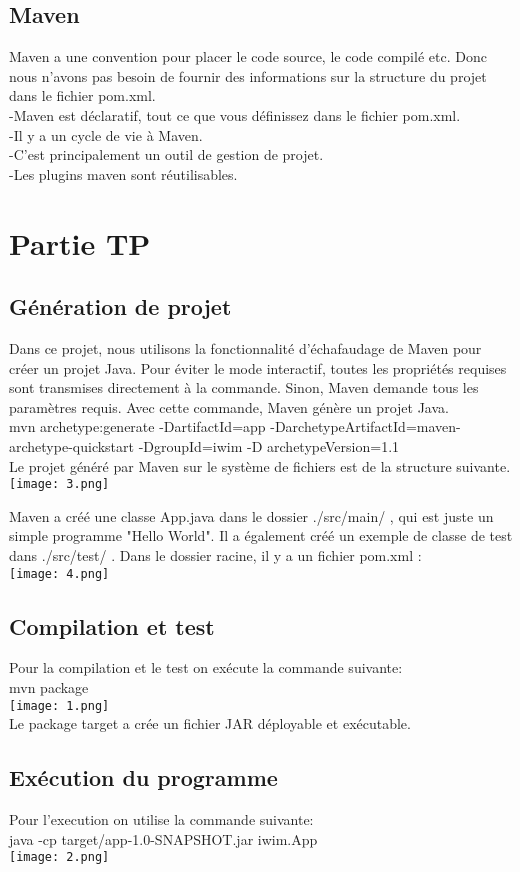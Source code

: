 \documentclass{report}
\begin{document}
\subsection{Maven}
Maven a une convention pour placer le code source, le code compilé etc. Donc nous n'avons pas besoin de fournir des informations sur la structure du projet dans le fichier pom.xml.\\
-Maven est déclaratif, tout ce que vous définissez dans le fichier pom.xml.\\
-Il y a un cycle de vie à Maven.\\
-C'est principalement un outil de gestion de projet.\\ 
-Les plugins maven sont réutilisables.\\
\section{Partie TP }
\subsection{Génération de projet}
Dans ce projet, nous utilisons la fonctionnalité d'échafaudage de Maven pour créer un projet Java. Pour éviter le mode interactif, toutes les propriétés requises sont transmises directement à la commande. Sinon, Maven demande tous les paramètres requis. 
Avec cette commande, Maven génère un projet Java.\\
mvn archetype:generate -DartifactId=app -DarchetypeArtifactId=maven-archetype-quickstart -DgroupId=iwim -D archetypeVersion=1.1\\
Le projet généré par Maven sur le système de fichiers est de la structure suivante.\\
\texttt{[image: 3.png]}

 Maven a créé une classe App.java dans le dossier ./src/main/ , qui est juste un simple programme "Hello World". Il a également créé un exemple de classe de test dans ./src/test/ . Dans le dossier racine, il y a un fichier pom.xml :\\

\texttt{[image: 4.png]}

 \newpage         
\subsection{Compilation et test}
Pour la compilation et le test on exécute la commande suivante:\\
mvn package\\
\texttt{[image: 1.png]}\\
Le package target a crée un fichier JAR déployable et exécutable.
\subsection{Exécution du programme }
Pour l'execution on utilise la commande suivante:\\
java -cp target/app-1.0-SNAPSHOT.jar iwim.App\\
\texttt{[image: 2.png]}

    
\end{document}

